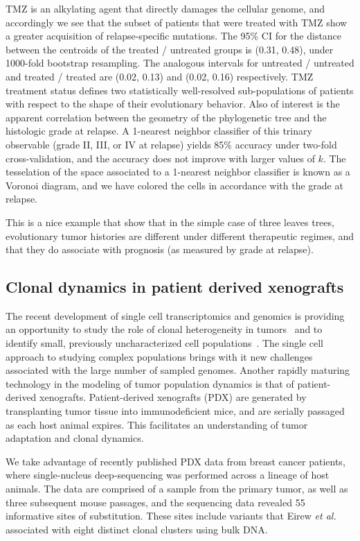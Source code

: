 \documentclass[a4paper,11pt]{article}
\begin{document}
TMZ is an alkylating agent that directly damages the cellular genome, and accordingly we see that the subset of patients that were treated with TMZ show a greater acquisition of relapse-specific mutations.
The 95\% CI for the distance between the centroids of the treated / untreated groups is (0.31, 0.48), under 1000-fold bootstrap resampling.
The analogous intervals for untreated / untreated and treated / treated are (0.02, 0.13) and (0.02, 0.16) respectively.
TMZ treatment status defines two statistically well-resolved sub-populations of patients with respect to the shape of their evolutionary behavior.
Also of interest is the apparent correlation between the geometry of the phylogenetic tree and the histologic grade at relapse.
A 1-nearest neighbor classifier of this trinary observable (grade II, III, or IV at relapse) yields 85\% accuracy under two-fold cross-validation, and the accuracy does not improve with larger values of $k$.
The tesselation of the space associated to a 1-nearest neighbor classifier is known as a Voronoi diagram, and we have colored the cells in accordance with the grade at relapse.

This is a nice example that show that in the simple case of three leaves trees, evolutionary tumor histories are different under different therapeutic regimes, and that they do associate with prognosis (as measured by grade at relapse).

\subsection{Clonal dynamics in patient derived xenografts}

The recent development of single cell transcriptomics and genomics is providing an opportunity to study the role of clonal heterogeneity in tumors~\cite{navin2011tumour, eirew2014dynamics, patel2014single} and to identify small, previously uncharacterized cell populations~\cite{grun2015single}.
The single cell approach to studying complex populations brings with it new challenges associated with the large number of sampled genomes.
Another rapidly maturing technology in the modeling of tumor population dynamics is that of patient-derived xenografts.
Patient-derived xenografts (PDX) are generated by transplanting tumor tissue into immunodeficient mice, and are serially passaged as each host animal expires.
This facilitates an understanding of tumor adaptation and clonal dynamics.

We take advantage of recently published PDX data from breast cancer patients, where single-nucleus deep-sequencing was performed across a lineage of host animals. \cite{eirew2014dynamics}
The data are comprised of a sample from the primary tumor, as well as three subsequent mouse passages, and the sequencing data revealed 55 informative sites of substitution.
These sites include variants that Eirew \textit{et al.} associated with eight distinct clonal clusters using bulk DNA.
\end{document}
